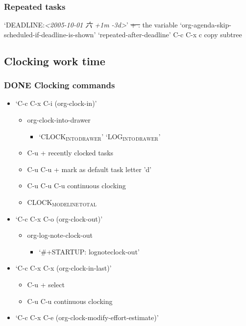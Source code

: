 \documentclass[11pt]{article}
\begin{document}
\subsubsection{Repeated tasks}
\label{sec:org3644891}
‘DEADLINE:\textit{<2005-10-01 六 +1m -3d>}’
\sout{+
.}
the variable ‘org-agenda-skip-scheduled-if-deadline-is-shown’ 
‘repeated-after-deadline’
C-c C-x c  copy subtree
\subsection{Clocking work time}
\label{sec:orgb2c5ab8}
\subsubsection{{\bfseries\sffamily DONE} Clocking commands}
\label{sec:org164453a}
\begin{itemize}
\item ‘C-c C-x C-i     (org-clock-in)’
\begin{itemize}
\item org-clock-into-drawer
\begin{itemize}
\item ‘CLOCK\(_{\text{INTO}}\)\(_{\text{DRAWER}}\)’ ‘LOG\(_{\text{INTO}}\)\(_{\text{DRAWER}}\)’
\end{itemize}
\item C-u + recently clocked tasks
\item C-u C-u + mark as default task      letter 'd'
\item C-u C-u C-u  continuous clocking
\item CLOCK\(_{\text{MODELINE}}\)\(_{\text{TOTAL}}\)
\end{itemize}
\item ‘C-c C-x C-o     (org-clock-out)’
\begin{itemize}
\item org-log-note-clock-out
\begin{itemize}
\item ‘\#+STARTUP: lognoteclock-out’
\end{itemize}
\end{itemize}
\item ‘C-c C-x C-x     (org-clock-in-last)’
\begin{itemize}
\item C-u + select
\item C-u C-u continuous clocking
\end{itemize}
\item ‘C-c C-x C-e     (org-clock-modify-effort-estimate)’

\end{itemize}
\end{document}
